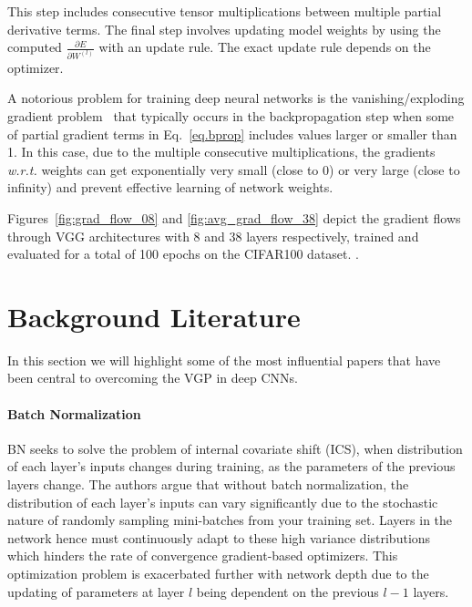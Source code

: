 \documentclass{article}
\begin{document}
This step includes consecutive tensor multiplications between multiple
partial derivative terms.
The final step involves updating model weights by using the computed 
$\frac{\partial E}{\partial W^{(l)}}$ with an update rule.
The exact update rule depends on the optimizer.

A notorious problem for training deep neural networks is the vanishing/exploding gradient
problem~\cite{bengio1993problem} that typically occurs in the backpropagation step when some of partial gradient terms in Eq.~\ref{eq.bprop} includes values larger or smaller than 1.
In this case, due to the multiple consecutive multiplications, the gradients \textit{w.r.t.} weights can get exponentially very small (close to 0) or very large (close to infinity) and
prevent effective learning of network weights.


%


Figures~\ref{fig:grad_flow_08} and \ref{fig:avg_grad_flow_38} depict the gradient flows through VGG architectures \cite{simonyan2014very} with 8 and 38 layers respectively, trained and evaluated for a total of 100 epochs on the CIFAR100 dataset. \questionOne.


\section{Background Literature}
\label{sec:lit_rev}
In this section we will highlight some of the most influential
papers that have been central to overcoming the VGP in
deep CNNs.

\paragraph{Batch Normalization}\cite{ioffe2015batch}
BN seeks to solve the  problem of 
internal covariate shift (ICS), when distribution of each layer’s 
inputs changes during training, as the parameters of the previous layers change. 
The authors argue that without batch normalization, the distribution of
each layer’s inputs can vary significantly due to the  stochastic nature of randomly sampling mini-batches from your
training set. 
Layers in the network hence must continuously adapt to these high variance distributions which hinders the rate of convergence gradient-based optimizers.
This optimization problem is exacerbated further with network depth due
to the updating of parameters at layer $l$ being dependent on
the previous $l-1$ layers.
\end{document}
